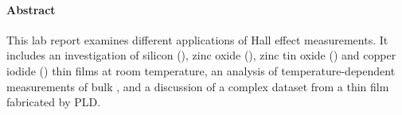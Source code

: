 \paragraph{Abstract}
This lab report examines different applications of Hall effect 
measurements. 
It includes an investigation of silicon (), zinc oxide (),
zinc tin oxide () and copper iodide () thin films at room temperature, 
an analysis of temperature-dependent measurements of bulk , and a 
discussion of a complex dataset from a  thin film fabricated 
by PLD.
